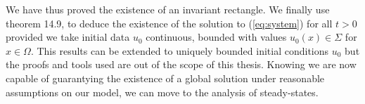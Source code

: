We have thus proved the existence of an invariant rectangle. We finally use theorem 14.9, \cite{Smoller1994} to deduce the existence of the solution to (\ref{eq:system}) for all $t>0$ provided we take initial data $u_0$ continuous, bounded with values $u_0(x) \in \Sigma$ for $x \in \Omega$. This results can be extended to uniquely bounded initial conditions $u_0$ but the proofs and tools used are out of the scope of this thesis. Knowing we are now capable of guarantying the existence of a global solution under reasonable assumptions on our model, we can move to the analysis of steady-states.


